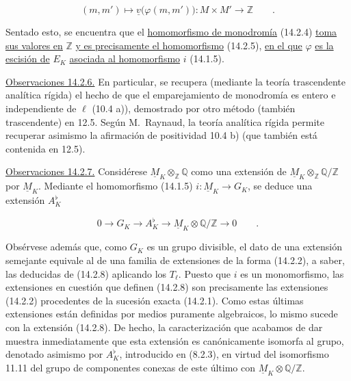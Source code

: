 \begin{equation}\tag{14.2.5}
 (m,m')\longmapsto\underline v\bigl(\varphi(m,m')\bigr):
 M\times M'\longrightarrow\mathbb Z\qquad .
\end{equation}

\noindent
Sentado esto, se encuentra que el \underline{homomorfismo de
monodromía} (14.2.4) \underline{toma sus valores en} $\mathbb Z$
\underline{y es precisamente el homomorfismo} (14.2.5), \underline{en
el que} $\varphi$ \underline{es la escisión de} $E_K$
\underline{asociada al homomorfismo} $i$ (14.1.5).

\medskip
\noindent
\underline{Observaciones 14.2.6.} En particular, se recupera (mediante
la teoría trascendente analítica rígida) el hecho de que el
emparejamiento de monodromía es entero e independiente de $\ell$
(10.4 a)), demostrado por otro método (también trascendente) en 12.5.
Según M.~Raynaud, la teoría analítica rígida permite recuperar asimismo
la afirmación de positividad 10.4 b) (que también está contenida en
12.5).

\medskip
\noindent
\underline{Observaciones 14.2.7.} Considérese
$\underline M_K\otimes_{\mathbb Z}\mathbb Q$ como una extensión de
$\underline M_K\otimes_{\mathbb Z}\mathbb Q/\mathbb Z$ por
$\underline M_K$. Mediante el homomorfismo (14.1.5)
$i:\underline M_K\longrightarrow G_K$, se deduce una extensión
$A_K^{\flat}$

\begin{equation}\tag{14.2.8}
 0\longrightarrow G_K\longrightarrow A_K^{\flat}
 \longrightarrow\underline M_K\otimes\mathbb Q/\mathbb Z
 \longrightarrow0\qquad .
\end{equation}

\noindent
Obsérvese además que, como $G_K$ es un grupo divisible, el dato de una
extensión semejante equivale al de una familia de extensiones de la
forma (14.2.2), a saber, las deducidas de (14.2.8) aplicando los
$T_\ell$. Puesto que $i$ es un monomorfismo, las extensiones en cuestión
que definen (14.2.8) son precisamente las extensiones (14.2.2)
procedentes de la sucesión exacta (14.2.1). Como estas últimas
extensiones están definidas por medios puramente algebraicos, lo mismo
sucede con la extensión (14.2.8). De hecho, la caracterización que
acabamos de dar muestra inmediatamente que esta extensión es
canónicamente isomorfa al grupo, denotado asimismo por $A_K^{\flat}$,
introducido en (8.2.3), en virtud del isomorfismo 11.11 del grupo de
componentes conexas de este último con
$\underline M_K\otimes\mathbb Q/\mathbb Z$.
